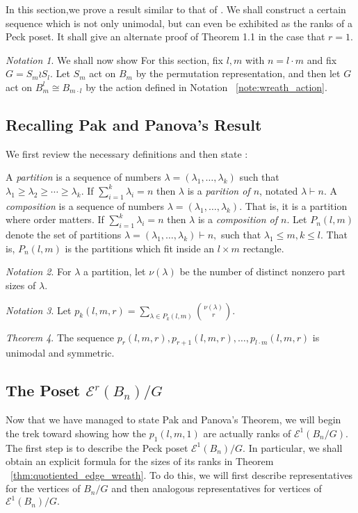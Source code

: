 \documentclass[10 pt]{amsart}
\theoremstyle{plain}
\theoremstyle{definition}
\theoremstyle{remark}
\numberwithin{equation}{section}
\newtheorem{thm}{Theorem}[section]
\theoremstyle{remark}
\newtheorem{note}[thm]{Notation}
\newcommand\ssec{\subsection}
\begin{document}
In this section,we prove a result similar to that of \cite[Theorem 1.1]{pak}. We shall construct a certain sequence which is not only unimodal, but can even be exhibited as the ranks of a Peck poset. It shall give an alternate proof of Theorem 1.1 in the case that $r = 1.$

\begin{note}
We shall now show 
For this section, fix $l,m$ with $n = l \cdot m$ and fix $G = S_m \wr S_l.$ Let $S_m$ act on $B_m$ by the permutation representation, and then let $G$ act on $B_{m}^l\cong B_{m \cdot l}$ by the action defined in Notation ~\ref{note:wreath_action}.
\end{note}

\ssec{Recalling Pak and Panova's Result}
We first review the necessary definitions and then state \cite[Theorem 1.1]{pak}:

A {\it partition} is a sequence of numbers $\lambda = (\lambda_1,\ldots, \lambda_k)$ such that $\lambda_1 \geq \lambda_2 \geq \cdots \geq \lambda_k.$ If $\sum_{i=1}^k \lambda_i = n$ then $\lambda$ is a {\it parition of $n$}, notated $\lambda \vdash n.$ A {\it composition} is a sequence of numbers $\lambda = (\lambda_1,\ldots, \lambda_k).$ That is, it is a partition where order matters. If $\sum_{i=1}^k \lambda_i = n$ then $\lambda$ is a {\it composition of $n$}. Let $P_n(l,m)$ denote the set of partitions $\lambda = (\lambda_1,\ldots, \lambda_k) \vdash n,$ such that $\lambda_1 \leq m,k \leq l.$ That is, $P_n(l,m)$ is the partitions which fit inside an $l \times m$ rectangle.

\begin{note}
\cite[Section 1]{pak} For $\lambda$ a partition, let $\nu(\lambda)$ be the number of distinct nonzero part sizes of $\lambda.$
\end{note}

\begin{note}
\cite[Section 1]{pak}
Let $p_k(l,m,r) = \sum_{\lambda \in P_k(l,m)} \binom{\nu(\lambda)}{r}.$
\end{note}

\begin{thm}
\label{thm:pak_thm}
\cite[Theorem 1.1]{pak}
The sequence $p_r(l,m,r), p_{r+1}(l,m,r),\ldots, p_{l\cdot m}(l,m,r)$ is unimodal and symmetric.
\end{thm}

\ssec{The Poset $\mathcal E^r(B_n)/G$}
Now that we have managed to state Pak and Panova's Theorem, we will begin the trek toward showing how the $p_1(l,m,1)$ are actually ranks of $\mathcal E^1(B_n/G).$ The first step is to describe the Peck poset $\mathcal E^1(B_n)/G.$ In particular, we shall obtain an explicit formula for the sizes of its ranks in Theorem ~\ref{thm:quotiented_edge_wreath}. To do this, we will first describe representatives for the vertices of $B_n/G$ and then analogous representatives for vertices of $\mathcal E^1(B_n)/G.$
\end{document}
